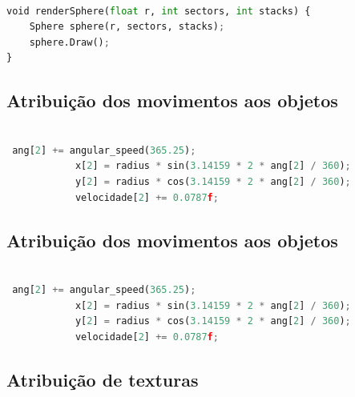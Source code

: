 \documentclass[12pt,a4paper]{memoir}
\begin{document}
\begin{lstlisting}[language=Python, caption=Função para desenhar a esfera]

void renderSphere(float r, int sectors, int stacks) {
    Sphere sphere(r, sectors, stacks);
    sphere.Draw();
}

\end{lstlisting}

\subsection{Atribuição dos movimentos aos objetos}

\begin{lstlisting}[language=Python, caption=Rotação e translação]

 ang[2] += angular_speed(365.25);
            x[2] = radius * sin(3.14159 * 2 * ang[2] / 360);
            y[2] = radius * cos(3.14159 * 2 * ang[2] / 360);
            velocidade[2] += 0.0787f;

\end{lstlisting}

\subsection{Atribuição dos movimentos aos objetos}

\begin{lstlisting}[language=Python, caption=Rotação e translação]

 ang[2] += angular_speed(365.25);
            x[2] = radius * sin(3.14159 * 2 * ang[2] / 360);
            y[2] = radius * cos(3.14159 * 2 * ang[2] / 360);
            velocidade[2] += 0.0787f;

\end{lstlisting}

\newpage

\subsection{Atribuição de texturas}
\end{document}
